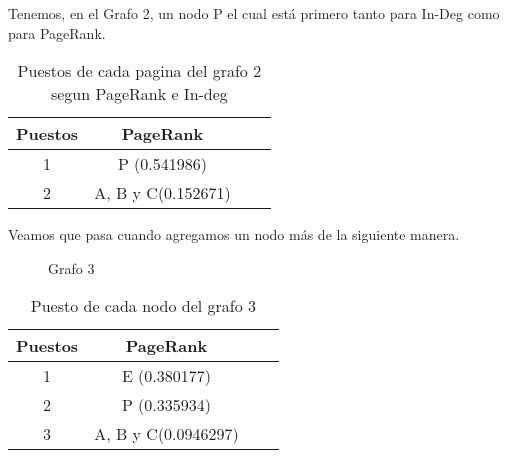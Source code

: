 Tenemos, en el Grafo 2, un nodo P el cual está primero tanto para In-Deg como para PageRank.

\begin{table}[H]
\centering
\begin{tabular}{| c | c | c | c |}
  \hline
  \rowcolor{LightCyan}
  Puestos & PageRank\\ \hline \hline
  1 & P (0.541986)\\ \hline
  2 & A, B y C(0.152671)\\ \hline
\end{tabular}
  \caption{\footnotesize{Puestos de cada pagina del grafo 2 segun PageRank e In-deg}}
  \label{tab:Rankings2}
\end{table}

Veamos que pasa cuando agregamos un nodo más de la siguiente manera.

\begin{figure}[H]
\centering
{}
  \caption{\footnotesize{ Grafo 3 }}
  \label{fig:Rankings}
\end{figure}

\begin{table}[H]
\centering
\begin{tabular}{| c | c | c | c |}
  \hline
  \rowcolor{LightCyan}
  Puestos & PageRank\\ \hline \hline
  1 & E (0.380177)\\ \hline
  2 & P (0.335934)\\ \hline
  3 & A, B y C(0.0946297)\\ \hline
\end{tabular}
  \caption{\footnotesize{Puesto de cada nodo del grafo 3}}
  \label{tab:Rankings3}
\end{table}

